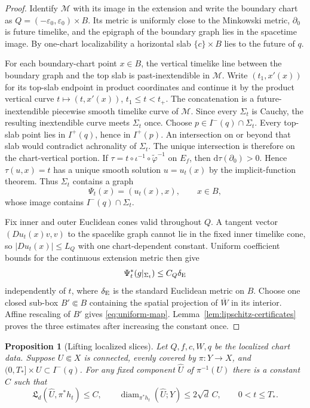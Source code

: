 \documentclass[10pt,a4paper]{article}
\numberwithin{equation}{section}
\newtheorem{proposition}[theorem]{Proposition}
\theoremstyle{definition}
\theoremstyle{remark}
\newcommand{\dd}{\mathrm d}
\newcommand{\diam}{\operatorname{diam}}
\newcommand{\cM}{\mathcal M}
\newcommand{\eps}{\varepsilon}
\begin{document}
\begin{proof}
Identify $\cM$ with its image in the extension and write the boundary chart
as $Q=(-\eps_0,\eps_0)\times B$.  Its metric is uniformly close to the
Minkowski metric, $\partial_0$ is future timelike, and the epigraph of the
boundary graph lies in the spacetime image.  By one-chart localizability a
horizontal slab $\{c\}\times B$ lies to the future of $q$.

For each boundary-chart point $x\in B$, the vertical timelike line between
the boundary graph and the top slab is past-inextendible in $\cM$.
Write $(t_1,x'(x))$ for its top-slab endpoint in product coordinates and
continue it by the product vertical curve $t\mapsto(t,x'(x))$,
$t_1\le t<t_+$.  The concatenation
is a future-inextendible piecewise smooth timelike curve of $\cM$.  Since every $\Sigma_t$ is Cauchy, the
resulting inextendible curve meets $\Sigma_t$ once.  Choose
$p\in I^-(q)\cap\Sigma_t$.  Every top-slab point lies in $I^+(q)$, hence
in $I^+(p)$.  An intersection on or beyond that slab would contradict
achronality of $\Sigma_t$.  The unique intersection is therefore on the
chart-vertical portion.  If
$\tau=t\circ\iota^{-1}\circ\widetilde\varphi^{-1}$ on $E_f$, then
$\dd\tau(\partial_0)>0$.  Hence $\tau(u,x)=t$ has a unique smooth solution
$u=u_t(x)$ by the implicit-function theorem.  Thus
$\Sigma_t$ contains a graph
\[
 \Psi_t(x)=(u_t(x),x),\qquad x\in B,
\]
whose image contains $I^-(q)\cap\Sigma_t$.

Fix inner and outer Euclidean cones valid throughout $Q$.  A tangent vector
$(D u_t(x)v,v)$ to the spacelike graph cannot lie in the fixed inner
timelike cone, so $|D u_t(x)|\le L_Q$ with one chart-dependent constant.
Uniform coefficient bounds for the continuous extension metric then give
\begin{equation}
 \Psi_t^*(g|_{\Sigma_t})\le C_Q\delta_{\rm E}
 \label{eq:graph-quadratic-bound}
\end{equation}
independently of $t$, where $\delta_{\rm E}$ is the standard Euclidean metric
on $B$.  Choose one closed sub-box $B'\Subset B$ containing the spatial
projection of $\overline W$ in its interior.  Affine rescaling of $B'$ gives
\eqref{eq:uniform-map}.  Lemma~\ref{lem:lipschitz-certificates} proves the
three estimates after increasing the constant once.
\end{proof}

\begin{proposition}[Lifting localized slices]
\label{prop:lifted-slices}
Let $Q,f,c,W,q$ be the localized chart data.  Suppose $U\Subset X$ is
connected, evenly covered by $\pi:Y\to X$, and
$(0,T_*]\times U\subset I^-(q)$.  For any fixed component
$\widehat U$ of $\pi^{-1}(U)$ there is a constant $C$ such that
\[
 \mathfrak L_d(\widehat U,\pi^*h_t)\le C,
 \qquad \diam_{\pi^*h_t}(\widehat U;Y)\le2\sqrt d\,C,
 \qquad 0<t\le T_*.
\]
\end{proposition}
\end{document}
